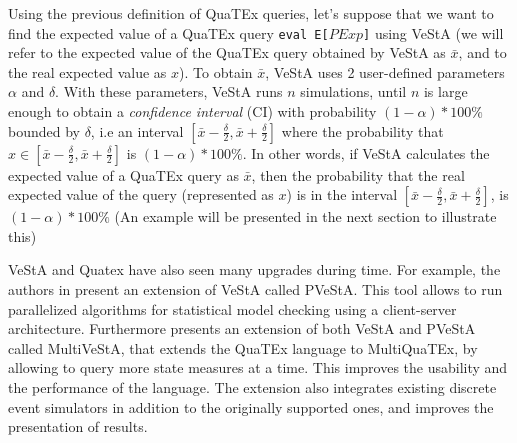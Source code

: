 Using the previous definition of QuaTEx queries, let's suppose that we want to find the expected value of a QuaTEx query \texttt{eval E[$PExp$]} using VeStA (we will refer to the expected value of the QuaTEx query obtained by VeStA as $\bar{x}$, and to the real expected value as $x$). To obtain $\bar{x}$, VeStA uses 2 user-defined parameters $\alpha$ and $\delta$. With these parameters, VeStA runs $n$ simulations, until $n$ is large enough to obtain a \textit{confidence interval} (CI) with probability $(1-\alpha) * 100\%$ bounded by $\delta$, i.e an interval $[\bar{x} - \frac{\delta}{2},\bar{x} + \frac{\delta}{2}]$ where the probability that $x \in [\bar{x} - \frac{\delta}{2},\bar{x} + \frac{\delta}{2}]$ is $(1-\alpha) * 100\%$. In other words, if VeStA calculates the expected value of a QuaTEx query as $\bar{x}$, then the probability that the real expected value of the query (represented as $x$) is in the interval $[\bar{x} - \frac{\delta}{2},\bar{x} + \frac{\delta}{2}]$, is $(1-\alpha) * 100\%$ (An example will be presented in the next section to illustrate this)

VeStA and Quatex have also seen many upgrades during time. For example, the authors in \cite{AlTurki2011} present an extension of VeStA called PVeStA. This tool allows to run parallelized algorithms for statistical model checking using a client-server architecture. Furthermore \cite{multivesta} presents an extension of both VeStA and PVeStA called MultiVeStA, that extends the QuaTEx language to MultiQuaTEx, by allowing to query more state measures at a time. This improves the usability and the performance of the language. The extension also integrates existing discrete event simulators in addition to the originally supported ones, and improves the presentation of results.

